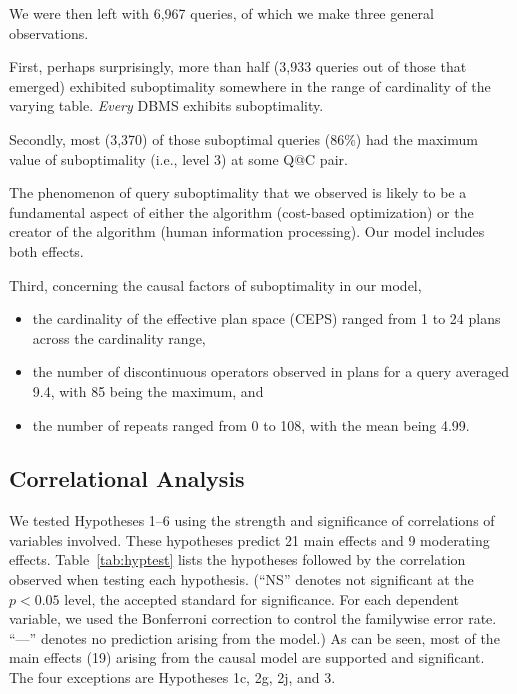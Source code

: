 \documentclass[prodmode,acmtods]{acmsmall}
\begin{document}
We were then left with 6,967 queries, of which we make three general observations.

First, perhaps surprisingly, 
more than half (3,933 queries out of those that emerged) exhibited suboptimality
somewhere in the range of cardinality of the varying table. 
{\em Every} \hbox{DBMS} exhibits suboptimality.

Secondly, most (3,370) of those suboptimal queries (86\%) had the maximum value of
suboptimality  (i.e., level 3) at some Q@C pair.

The phenomenon of query suboptimality that we observed is likely to be a
fundamental aspect of either the algorithm (cost-based optimization) or the
creator of the algorithm (human information processing). Our model includes
both effects.

Third, concerning the causal factors of suboptimality in our model,
\begin{itemize}
\item the cardinality of the effective plan space (CEPS) ranged from 1 to 24
plans across the cardinality range,
\item the number of discontinuous operators observed in plans for a query
averaged 9.4, with 85 being the maximum, and
\item the number of repeats ranged from 0 to 108, with the mean being 4.99.
\end{itemize}
 
\subsection{Correlational Analysis}\label{sec:corr}
We tested Hypotheses 1--6 using the strength and significance of
correlations of variables involved. These hypotheses predict 21 main effects
and 9 moderating effects. Table~\ref{tab:hyptest} lists the hypotheses
followed by the correlation observed when testing each hypothesis.  (``NS''
denotes not significant at the $p < 0.05$ level, the accepted standard for
significance. For each dependent variable, we used the Bonferroni correction
to control the familywise error rate. ``---'' denotes no prediction arising
from the model.)  As can be seen, most of the main effects (19) arising from
the causal model are supported and significant.  The four exceptions are
Hypotheses 1c, 2g, 2j, and 3.
\end{document}
